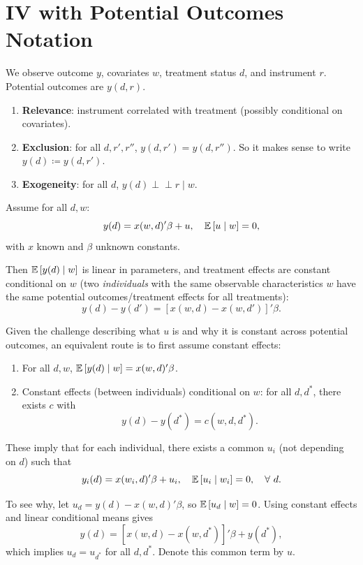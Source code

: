 \section{IV with Potential Outcomes Notation}

\begin{definition}
	We observe outcome $y$, covariates $w$, treatment status $d$, and instrument $r$. Potential outcomes are $y(d,r)$.
	\begin{enumerate}[label=(\roman*)]
		\item \textbf{Relevance}: instrument correlated with treatment (possibly conditional on covariates).
		\item \textbf{Exclusion}: for all $d,r',r''$, $y(d,r')=y(d,r'')$. So it makes sense to write $y(d) \coloneqq y(d,r')$.
		\item \textbf{Exogeneity}: for all $d$, $y(d) \perp\!\!\!\perp r \mid w$.
	\end{enumerate}
\end{definition}

\begin{assumption}
	Assume for all $d,w$: \[
		y(d)=x(w,d)'\beta + u, \quad \mathbb{E}\left[u \mid w\right]=0
	,\]
	with $x$ known and $\beta$ unknown constants.

	Then $\mathbb{E}\left[y(d)\mid w\right]$ is linear in parameters, and treatment effects are constant conditional on $w$ (two \emph{individuals} with the same observable characteristics $w$ have the same potential outcomes/treatment effects for all treatments): \[
		y(d)-y(d') = \left[x(w,d)-x(w,d')\right]'\beta
	.\]
\end{assumption}

\begin{remark}
	Given the challenge describing what $u$ is and why it is constant across potential outcomes, an equivalent route is to first assume constant effects:
	\begin{enumerate}[label=(\roman*)]
		\item For all $d,w$, $\mathbb{E}\left[y(d)\mid w\right] = x(w,d)'\beta$.
		\item Constant effects (between individuals) conditional on $w$: for all $d,d^*$, there exists $c$ with \[
			y(d)-y(d^*) = c(w,d,d^*)
		.\]
	\end{enumerate}
	These imply that for each individual, there exists a common $u_i$ (not depending on $d$) such that \[
		y_i(d)=x(w_i,d)'\beta + u_i, \quad \mathbb{E}\left[u_i\mid w_i\right]=0, \quad \forall\ d
	.\]

	To see why, let $u_d = y(d)-x(w,d)'\beta$, so $\mathbb{E}\left[u_d \mid w\right]=0$. Using constant effects and linear conditional means gives \[
		y(d)=\left[x(w,d)-x(w,d^*)\right]'\beta + y(d^*)
	,\]
	which implies $u_d=u_{d^*}$ for all $d,d^*$. Denote this common term by $u$.
\end{remark}



